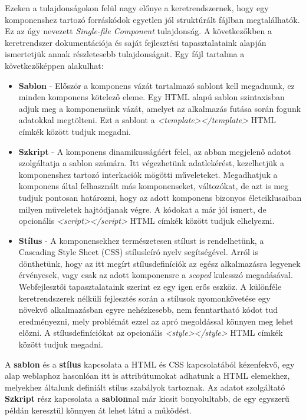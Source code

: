 \documentclass[12pt]{article}
\begin{document}
Ezeken a tulajdonságokon felül nagy előnye a keretrendszernek, hogy egy komponenshez tartozó forráskódok egyetlen jól struktúrált fájlban megtalálhatók. Ez az úgy nevezett \textit{Single-file Component} tulajdonság. A következőkben a keretrendszer dokumentációja \cite{VUE_DOCS} és saját fejlesztési tapasztalataink alapján ismertetjük annak részletesebb tulajdonságait. Egy fájl tartalma a következőképpen alakulhat:
\begin{itemize}
	\item[]\textbf{Sablon}
	- Először a komponens vázát tartalmazó sablont kell megadnunk, ez minden komponens kötelező eleme. Egy HTML alapú sablon szintaxisban adjuk meg a komponensünk vázát, amelyet az alkalmazás futása során fogunk adatokkal megtölteni. Ezt a sablont a \textit{<template></template>} HTML címkék között tudjuk megadni.
	\item[]\textbf{Szkript}
	- A komponens dinamikusságáért felel, az abban megjelenő adatot szolgáltatja a sablon számára. Itt végezhetünk adatlekérést, kezelhetjük a komponenshez tartozó interkaciók mögötti műveleteket. Megadhatjuk a komponens által felhasznált más komponenseket, változókat, de azt is meg tudjuk pontosan határozni, hogy az adott komponens bizonyos életciklusaiban milyen műveletek hajtódjanak végre. A kódokat a már jól ismert, de opcionális  \textit{<script></script>} HTML címkék között tudjuk elhelyezni. 
	\item[]\textbf{Stílus}
	- A komponensekhez természetesen stílust is rendelhetünk, a Cascading Style Sheet (CSS) stílusleíró nyelv segítségével. Arról is dönthetünk, hogy az itt megírt stílusdefiníciók az egész alkalmazásra legyenek érvényesek, vagy csak az adott komponensre a \textit{scoped} kulcsszó megadásával. Webfejlesztői tapasztalataink szerint ez egy igen erős eszköz. A különféle keretrendszerek nélküli fejlesztés során a stílusok nyomonkövetése egy növekvő alkalmazásban egyre nehézkesebb, nem fenntartható kódot tud eredményezni, mely problémát ezzel az apró megoldással könnyen meg lehet előzni. A stílusdefiníciókat az opcionális \textit{<style></style>} HTML címkék között tudjuk megadni.
\end{itemize}

A \textbf{sablon} és a \textbf{stílus} kapcsolata a HTML és CSS kapcsolatából kézenfekvő, egy alap weblaphoz hasonlóan itt is attribútumokat adhatunk a HTML elemekhez, melyekhez általunk definiált stílus szabályok tartoznak. Az adatot szolgáltató \textbf{Szkript} rész kapcsolata a \textbf{sablon}nal már kicsit bonyolultabb, de egy egyszerű példán keresztül könnyen át lehet látni a működést.
\end{document}
